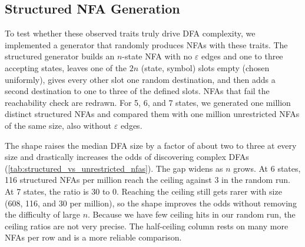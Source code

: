 \documentclass[9pt]{ieeeconf}
\begin{document}
\subsection{Structured NFA Generation}
\label{sec:structured}

To test whether these observed traits truly drive DFA complexity, we implemented a generator that randomly produces NFAs with these traits. The structured generator builds an $n$-state NFA with no $\varepsilon$ edges and one to three accepting states, leaves one of the $2n$ (state, symbol) slots empty (chosen uniformly), gives every other slot one random destination, and then adds a second destination to one to three of the defined slots. NFAs that fail the reachability check are redrawn. For 5, 6, and 7 states, we generated one million distinct structured NFAs and compared them with one million unrestricted NFAs of the same size, also without $\varepsilon$ edges.

The shape raises the median DFA size by a factor of about two to three at every size and drastically increases the odds of discovering complex DFAs (\cref{tab:structured_vs_unrestricted_nfas}). The gap widens as $n$ grows. At 6 states, 116 structured NFAs per million reach the ceiling against 3 in the random run. At 7 states, the ratio is 30 to 0. Reaching the ceiling still gets rarer with size (608, 116, and 30 per million), so the shape improves the odds without removing the difficulty of large $n$. Because we have few ceiling hits in our random run, the ceiling ratios are not very precise. The half-ceiling column rests on many more NFAs per row and is a more reliable comparison.
\end{document}
